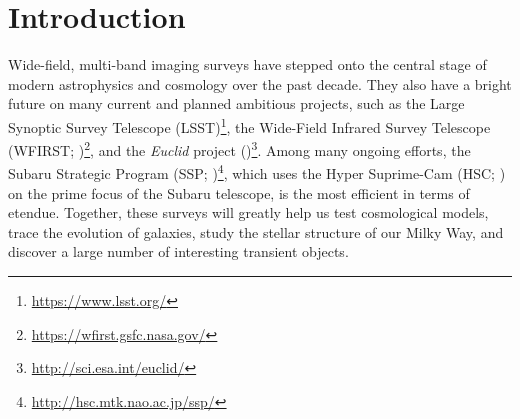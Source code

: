 \documentclass[useamsfonts]{pasj01}
\begin{document}
\section{Introduction}
    \label{sec:intro}

    Wide-field, multi-band imaging surveys have stepped onto the central stage of
    modern astrophysics and cosmology over the past decade.
    They also have a bright future on many current and planned ambitious projects, such as the Large Synoptic Survey Telescope
    (LSST)\footnote{\url{https://www.lsst.org/}}, the Wide-Field Infrared Survey
    Telescope
    (WFIRST; \citealt{Dressler2012})\footnote{\url{https://wfirst.gsfc.nasa.gov/}},
    and the \textit{Euclid} project
    (\citealt{Laureijs2012})\footnote{\url{http://sci.esa.int/euclid/}}.
    Among many ongoing efforts, the Subaru Strategic Program
    (SSP; \citealt{HSCDR1})\footnote{\url{http://hsc.mtk.nao.ac.jp/ssp/}}, which
    uses the Hyper Suprime-Cam (HSC; \citealt{Miyazaki2012}) on the prime focus of
    the Subaru telescope, is the most efficient in terms of etendue.
    Together, these surveys will greatly help us test cosmological models, trace the
    evolution of galaxies, study the stellar structure of our Milky Way, and discover
    a large number of interesting transient objects.
\end{document}
